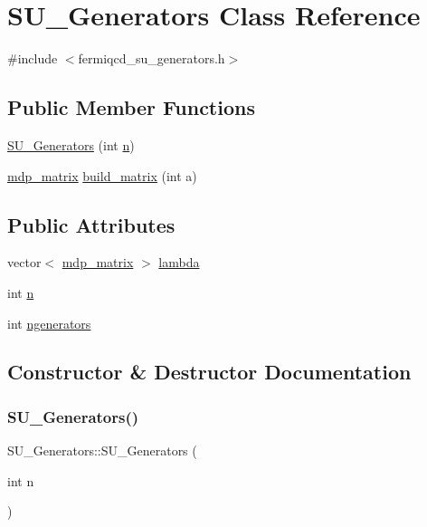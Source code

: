 \hypertarget{class_s_u___generators}{}\section{S\+U\+\_\+\+Generators Class Reference}
\label{class_s_u___generators}


{\ttfamily \#include $<$fermiqcd\+\_\+su\+\_\+generators.\+h$>$}

\subsection*{Public Member Functions}
\begin{DoxyCompactItemize}
\item 
\hyperlink{class_s_u___generators_a046ea4e0e0a22d86568eb8012cf0032b}{S\+U\+\_\+\+Generators} (int \hyperlink{class_s_u___generators_a02ad86d7679e2e64a7177d6caecb12fd}{n})
\item 
\hyperlink{classmdp__matrix}{mdp\+\_\+matrix} \hyperlink{class_s_u___generators_aba3244f13bc625fabd171cce694f3e9b}{build\+\_\+matrix} (int a)
\end{DoxyCompactItemize}
\subsection*{Public Attributes}
\begin{DoxyCompactItemize}
\item 
vector$<$ \hyperlink{classmdp__matrix}{mdp\+\_\+matrix} $>$ \hyperlink{class_s_u___generators_a15ed0103ec40c52a54b3900516ed713f}{lambda}
\item 
int \hyperlink{class_s_u___generators_a02ad86d7679e2e64a7177d6caecb12fd}{n}
\item 
int \hyperlink{class_s_u___generators_a0ad4b16aa28e9eabeb738634efa1fa23}{ngenerators}
\end{DoxyCompactItemize}


\subsection{Constructor \& Destructor Documentation}
\mbox{\label{class_s_u___generators_a046ea4e0e0a22d86568eb8012cf0032b}} 
\subsubsection{\texorpdfstring{S\+U\+\_\+\+Generators()}{SU\_Generators()}}
{\footnotesize\ttfamily S\+U\+\_\+\+Generators\+::\+S\+U\+\_\+\+Generators (\begin{DoxyParamCaption}\item[{int}]{n }\end{DoxyParamCaption})\hspace{0.3cm}{\ttfamily [inline]}}



